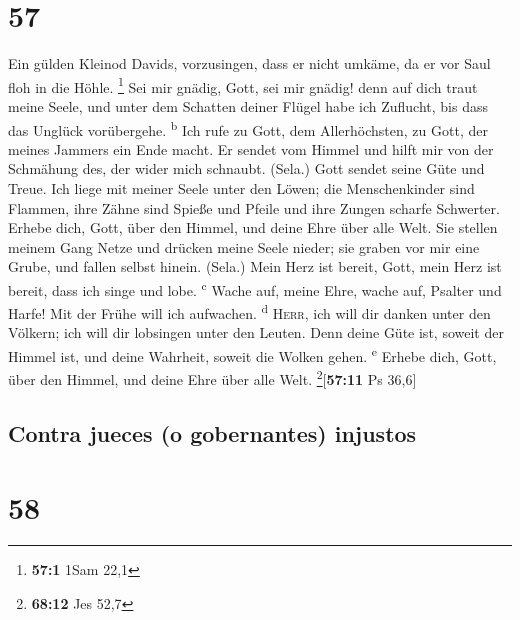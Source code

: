 \hypertarget{section-56}{%
\section{57}\label{section-56}}

 Ein gülden Kleinod Davids, vorzusingen, dass er nicht
umkäme, da er vor Saul floh in die Höhle. \footnote{\textbf{57:1} 1Sam
  22,1}  Sei mir gnädig, Gott, sei mir gnädig! denn auf
dich traut meine Seele, und unter dem Schatten deiner Flügel habe ich
Zuflucht, bis dass das Unglück vorübergehe. \textsuperscript{b}
 Ich rufe zu Gott, dem Allerhöchsten, zu Gott, der meines
Jammers ein Ende macht.  Er sendet vom Himmel und hilft
mir von der Schmähung des, der wider mich schnaubt. (Sela.) Gott sendet
seine Güte und Treue.  Ich liege mit meiner Seele unter
den Löwen; die Menschenkinder sind Flammen, ihre Zähne sind Spieße und
Pfeile und ihre Zungen scharfe Schwerter.  Erhebe dich,
Gott, über den Himmel, und deine Ehre über alle Welt.  Sie
stellen meinem Gang Netze und drücken meine Seele nieder; sie graben vor
mir eine Grube, und fallen selbst hinein. (Sela.)  Mein
Herz ist bereit, Gott, mein Herz ist bereit, dass ich singe und lobe.
\textsuperscript{c}  Wache auf, meine Ehre, wache auf,
Psalter und Harfe! Mit der Frühe will ich aufwachen. \textsuperscript{d}
 \textsc{Herr}, ich will dir danken unter den Völkern;
ich will dir lobsingen unter den Leuten.  Denn deine Güte
ist, soweit der Himmel ist, und deine Wahrheit, soweit die Wolken gehen.
\textsuperscript{e}  Erhebe dich, Gott, über den Himmel,
und deine Ehre über alle Welt. \footnote{\textbf{68:12} Jes 52,7}{[}\textbf{57:11}
Ps 36,6{]}

\hypertarget{contra-jueces-o-gobernantes-injustos}{%
\subsection{Contra jueces (o gobernantes)
injustos}\label{contra-jueces-o-gobernantes-injustos}}

\hypertarget{section-57}{%
\section{58}\label{section-57}}

